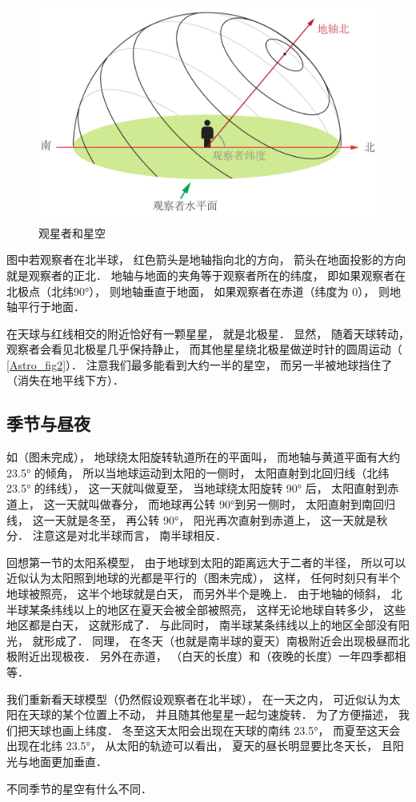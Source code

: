 \begin{figure}[ht]
\centering
\includegraphics[width=11.5cm]{./figures/Astro3.pdf}
\caption{观星者和星空} \label{Astro_fig3}
\end{figure}

图中若观察者在北半球， 红色箭头是地轴指向北的方向， 箭头在地面投影的方向就是观察者的正北． 地轴与地面的夹角等于观察者所在的纬度， 即如果观察者在北极点（北纬90°）， 则地轴垂直于地面， 如果观察者在赤道（纬度为 0）， 则地轴平行于地面．

在天球与红线相交的附近恰好有一颗星星， 就是北极星． 显然， 随着天球转动， 观察者会看见北极星几乎保持静止， 而其他星星绕北极星做逆时针的圆周运动（ \autoref{Astro_fig2}）． 注意我们最多能看到大约一半的星空， 而另一半被地球挡住了（消失在地平线下方）．

\subsection{季节与昼夜}

如（图未完成）， 地球绕太阳旋转轨道所在的平面叫， 而地轴与黄道平面有大约 23.5° 的倾角， 所以当地球运动到太阳的一侧时， 太阳直射到北回归线（北纬 23.5° 的纬线）， 这一天就叫做夏至， 当地球绕太阳旋转 90° 后， 太阳直射到赤道上， 这一天就叫做春分， 而地球再公转 90°到另一侧时， 太阳直射到南回归线， 这一天就是冬至， 再公转 90°， 阳光再次直射到赤道上， 这一天就是秋分． 注意这是对北半球而言， 南半球相反．

回想第一节的太阳系模型， 由于地球到太阳的距离远大于二者的半径， 所以可以近似认为太阳照到地球的光都是平行的（图未完成）， 这样， 任何时刻只有半个地球被照亮， 这半个地球就是白天， 而另外半个是晚上． 由于地轴的倾斜， 北半球某条纬线以上的地区在夏天会被全部被照亮， 这样无论地球自转多少， 这些地区都是白天， 这就形成了． 与此同时， 南半球某条纬线以上的地区全部没有阳光， 就形成了． 同理， 在冬天（也就是南半球的夏天）南极附近会出现极昼而北极附近出现极夜． 另外在赤道， （白天的长度）和（夜晚的长度）一年四季都相等．


我们重新看天球模型（仍然假设观察者在北半球）， 在一天之内， 可近似认为太阳在天球的某个位置上不动， 并且随其他星星一起匀速旋转． 为了方便描述， 我们把天球也画上纬度． 冬至这天太阳会出现在天球的南纬 23.5°， 而夏至这天会出现在北纬 23.5°， 从太阳的轨迹可以看出， 夏天的昼长明显要比冬天长， 且阳光与地面更加垂直． 

不同季节的星空有什么不同．










